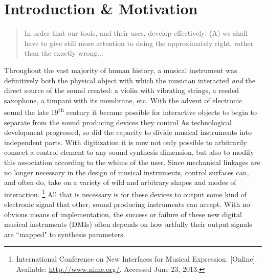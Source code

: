 
\chapter{Introduction \& Motivation}

\begin{quote}
In order that our tools, and their uses, develop effectively: (A) we shall have to give still more attention to doing the approximately right, rather than the exactly wrong... \cite{tuckey}
\end{quote}

Throughout the vast majority of human history, a musical instrument was definitively both the physical object with which the musician interacted \emph{and} the direct source of the sound created: a violin with vibrating strings, a reeded saxophone, a timpani with its membrane, etc.  With the advent of electronic sound the late 19\textsuperscript{th} century it became possible for interactive objects to begin to separate from the sound producing devices they control \cite{chadabe}
As technological development progressed, so did the capacity to divide musical instruments into independent parts. With digitization it is now not only possible to arbitrarily connect a control element to any sound synthesis dimension, but also to modify this association according to the whims of the user. Since mechanical linkages are no longer necessary in the design of musical instruments, control surfaces can, and often do, take on a variety of wild and arbitrary shapes and modes of interaction. \footnote{International Conference on New Interfaces for Musical Expression. [Online]. Available: \url{http://www.nime.org/}. Accessed June 23, 2013.}
All that is necessary is for these devices to output some kind of electronic signal that other, sound producing instruments can accept. With no obvious means of implementation, the success or failure of these new digital musical instruments (DMIs) often depends on how artfully their output signals are ``mapped" to synthesis parameters.

